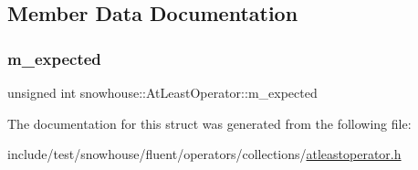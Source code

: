 \subsection{Member Data Documentation}
\mbox{\label{structsnowhouse_1_1AtLeastOperator_a10580b89701c1be5eafae3b799949970}} 
\subsubsection{\texorpdfstring{m\_expected}{m\_expected}}
{\footnotesize\ttfamily unsigned int snowhouse\+::\+At\+Least\+Operator\+::m\+\_\+expected}



The documentation for this struct was generated from the following file\+:\begin{DoxyCompactItemize}
\item 
include/test/snowhouse/fluent/operators/collections/\mbox{\hyperlink{atleastoperator_8h}{atleastoperator.\+h}}\end{DoxyCompactItemize}
